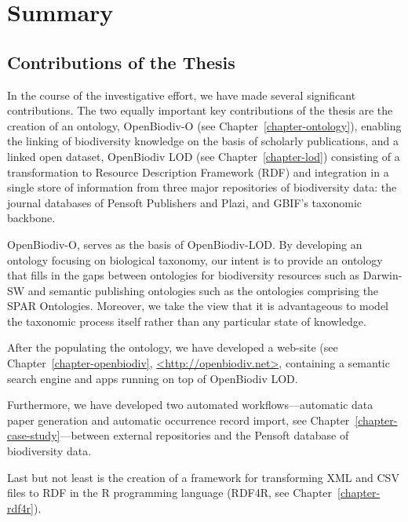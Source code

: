
\chapter{Summary} %

\label{chapter:summary} %

\section{Contributions of the Thesis}

In the course of the investigative effort, we have made several significant contributions. The two equally important key contributions of the thesis are the creation of an ontology, OpenBiodiv-O (see Chapter~\ref{chapter-ontology}), enabling the linking of biodiversity knowledge on the basis of scholarly publications, and a linked open dataset, OpenBiodiv LOD (see Chapter~\ref{chapter-lod}) consisting of a transformation to Resource Description Framework (RDF) and integration in a single store of information from three major repositories of biodiversity data: the journal databases of Pensoft Publishers and Plazi, and GBIF's taxonomic backbone.

OpenBiodiv-O, serves as the basis of OpenBiodiv-LOD. By developing an ontology focusing on biological taxonomy, our intent is to provide an ontology that fills in the gaps between ontologies for biodiversity resources such as Darwin-SW and semantic publishing ontologies such as the ontologies comprising the SPAR Ontologies. Moreover, we take the view that it is advantageous to model the taxonomic process itself rather than any particular state of knowledge.

After the populating the ontology, we have developed a web-site (see Chapter~\ref{chapter-openbiodiv}, \href{http://openbiodiv.net}{<http://openbiodiv.net>}, containing a semantic search engine and apps running on top of OpenBiodiv LOD.

Furthermore, we have developed two automated workflows---automatic data paper generation and automatic occurrence record import, see Chapter~\ref{chapter-case-study}---between external repositories and the Pensoft database of biodiversity data.

Last but not least is the creation of a framework for transforming XML and CSV files to RDF in the R programming language (RDF4R, see Chapter~\ref{chapter-rdf4r}).